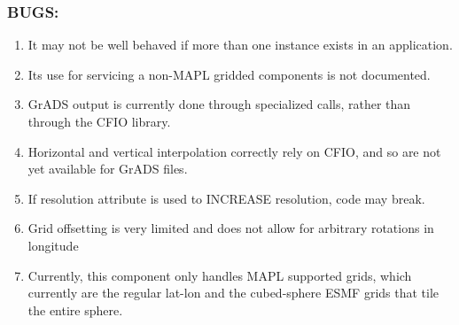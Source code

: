 \subsubsection*{BUGS:}

 \begin{enumerate}
 \item It may not be well behaved if more than one instance exists in an application.
 \item Its use for servicing a non-MAPL gridded components is not documented.
 \item GrADS output is currently done through specialized calls, rather than through the 
       CFIO library.
 \item Horizontal and vertical interpolation correctly 
       rely on CFIO, and so are not yet available for GrADS files.
 \item If resolution attribute is used to INCREASE resolution, code may break.   
 \item Grid offsetting is very limited and does not allow for arbitrary rotations
       in longitude 
 \item Currently, this component only handles MAPL supported grids, which currently are 
       the regular lat-lon and the cubed-sphere ESMF grids that tile the entire sphere.

 \end{enumerate}

  
